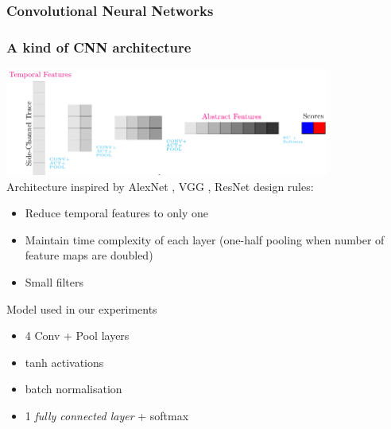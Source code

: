 \begin{frame}
\frametitle{Convolutional Neural Networks}

\end{frame}

\begin{frame}
\frametitle{A kind of CNN architecture}
\vspace*{-10pt}
\includegraphics[width=0.8\textwidth]{../tikz_per_manuscritto/convnet_arch.pdf} \\
Architecture inspired by AlexNet \cite{KSH12}, VGG \cite{simonyan2014very}, ResNet \cite{he2016deep} design rules:
\begin{itemize}
\item Reduce temporal features to only one
\item Maintain time complexity of each layer (one-half pooling when number of feature maps are doubled)
\item Small filters
\end{itemize}
\begin{block}{Model used in our experiments}
\begin{itemize}
\item 4 Conv + Pool layers
\item tanh activations
\item batch normalisation \cite{batch_norm}
\item 1 \emph{fully connected layer} + softmax
\end{itemize}
\end{block}

\end{frame}

